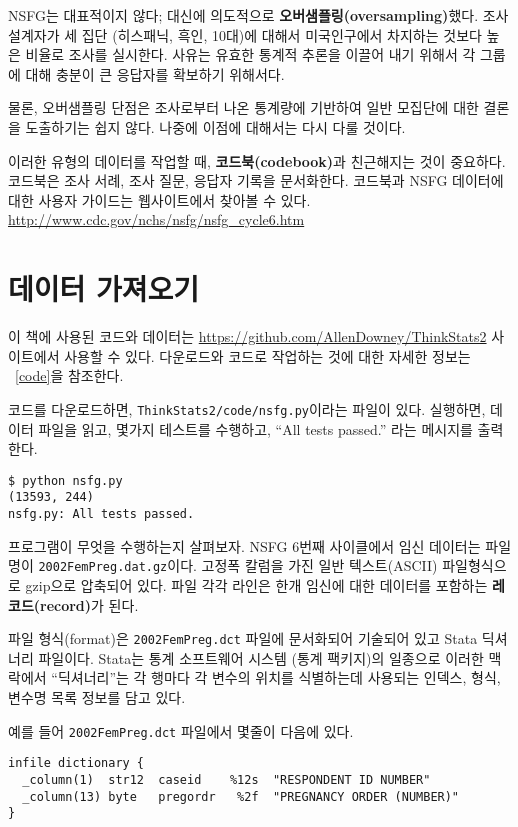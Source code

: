 
NSFG는 대표적이지 않다; 대신에 의도적으로 {\bf 오버샘플링(oversampling)}했다.
조사 설계자가 세 집단 (히스패닉, 흑인, 10대)에 대해서 미국인구에서 차지하는 것보다 높은 비율로 조사를 실시한다.
사유는 유효한 통계적 추론을 이끌어 내기 위해서 각 그룹에 대해 충분이 큰 응답자를 확보하기 위해서다.


물론, 오버샘플링 단점은 조사로부터 나온 통계량에 기반하여 일반 모집단에 대한 결론을 도출하기는 쉽지 않다. 
나중에 이점에 대해서는 다시 다룰 것이다.

이러한 유형의 데이터를 작업할 때, {\bf 코드북(codebook)}과 친근해지는 것이 중요하다.
코드북은 조사 서례, 조사 질문, 응답자 기록을 문서화한다. 코드북과 NSFG 데이터에 대한 사용자 가이드는 웹사이트에서 찾아볼 수 있다. \url{http://www.cdc.gov/nchs/nsfg/nsfg_cycle6.htm}


\section{데이터 가져오기}

이 책에 사용된 코드와 데이터는 \url{https://github.com/AllenDowney/ThinkStats2} 사이트에서 사용할 수 있다.
다운로드와 코드로 작업하는 것에 대한 자세한 정보는 ~\ref{code}을 참조한다.

코드를 다운로드하면, {\tt ThinkStats2/code/nsfg.py}이라는 파일이 있다. 
실행하면, 데이터 파일을 읽고, 몇가지 테스트를 수행하고, ``All tests passed.'' 라는 메시지를 출력한다.
\begin{verbatim}
$ python nsfg.py
(13593, 244)
nsfg.py: All tests passed.
\end{verbatim}

프로그램이 무엇을 수행하는지 살펴보자. NSFG 6번째 사이클에서 임신 데이터는 파일명이 {\tt 2002FemPreg.dat.gz}이다.
고정폭 칼럼을 가진 일반 텍스트(ASCII) 파일형식으로 gzip으로 압축되어 있다. 
파일 각각 라인은 한개 임신에 대한 데이터를 포함하는 {\bf 레코드(record)}가 된다.

파일 형식(format)은 {\tt 2002FemPreg.dct} 파일에 문서화되어 기술되어 있고 Stata 딕셔너리 파일이다.
Stata는 통계 소프트웨어 시스템 (통계 팩키지)의 일종으로 이러한 맥락에서 ``딕셔너리''는 각 행마다 각 변수의 위치를 식별하는데 사용되는 인덱스, 형식, 변수명 목록 정보를 담고 있다.  

예를 들어 {\tt 2002FemPreg.dct} 파일에서 몇줄이 다음에 있다.

%
\begin{verbatim}
infile dictionary {
  _column(1)  str12  caseid    %12s  "RESPONDENT ID NUMBER"
  _column(13) byte   pregordr   %2f  "PREGNANCY ORDER (NUMBER)"
}
\end{verbatim}


